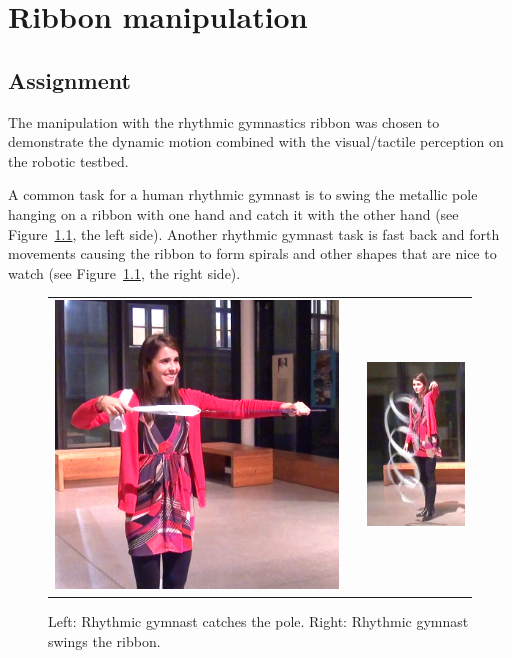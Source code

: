 \graphicspath{{Img/ribbon/}}

\chapter{Ribbon manipulation}

    \section{Assignment}
        The manipulation with the rhythmic gymnastics ribbon was chosen to demonstrate the dynamic motion combined with the visual/tactile perception on the \CloPeMa\/ robotic testbed.

        A common task for a human rhythmic gymnast is to swing the metallic pole hanging on a ribbon with one hand and catch it with the other hand (see Figure~\ref{fig:HumanGymnast}, the left side). Another rhythmic gymnast task is fast back and forth movements causing the ribbon to form spirals and other shapes that are nice to watch (see Figure~\ref{fig:HumanGymnast}, the right side).

        \begin{figure}[h]
            \centering
            \begin{tabular}{ccc}
            \includegraphics[height=0.35\textwidth]{HumanGymnastPendulum.png}
            & &
            \includegraphics[height=0.35\textwidth]{HumanGymnastShapes.png}
            \end{tabular}
            \caption{Left: Rhythmic gymnast catches the pole. Right: Rhythmic gymnast swings the ribbon.}
            \label{fig:HumanGymnast}
        \end{figure}



